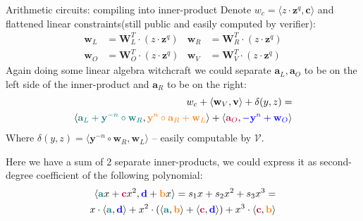 \documentclass{zkdl-presentation-template}
\begin{document}
\begin{frame}{Arithmetic circuits: compiling into inner-product}
    Denote $w_c = \langle z \cdot \mathbf{z}^q, \mathbf{c} \rangle$ and flattened linear constraints(still public and easily computed by verifier):
    \begin{equation*}
        \begin{aligned}
            \mathbf{w}_L &= \mathbf{W}_L^T \cdot (z \cdot \mathbf{z}^q) &
            \mathbf{w}_R &= \mathbf{W}_R^T \cdot (z \cdot \mathbf{z}^q) \\
            \mathbf{w}_O &= \mathbf{W}_O^T \cdot (z \cdot \mathbf{z}^q) &
            \mathbf{w}_V &= \mathbf{W}_V^T \cdot (z \cdot \mathbf{z}^q) 
        \end{aligned}
    \end{equation*}
    Again doing some linear algebra witchcraft we could separate $\mathbf{a}_L, \mathbf{a}_O$ to be on the left side of the inner-product and $\mathbf{a}_R$ to be on the right:
        \begin{equation*}
            \begin{aligned}
                w_c + \langle \mathbf{w}_V, \mathbf{v} \rangle + \delta(y, z) =\\
                \langle \textcolor{teal}{\mathbf{a}_L + \mathbf{y}^{-n} \circ \mathbf{w}_R}, \textcolor{orange}{\mathbf{y}^n \circ \mathbf{a}_R + \mathbf{w}_L} \rangle + \langle \textcolor{purple}{\mathbf{a}_O}, \textcolor{blue}{ -\mathbf{y}^n + \mathbf{w}_O} \rangle
            \end{aligned}
        \end{equation*}
        Where $\delta(y, z) = \langle \mathbf{y}^{-n} \circ \mathbf{w}_R, \mathbf{w}_L \rangle$ -- easily computable by $\mathcal{V}$.

        Here we have a sum of 2 separate inner-products, we could express it as second-degree coefficient of the following polynomial:
        \begin{equation*}
            \begin{aligned}
            \langle \textcolor{teal}{\mathbf{a}}x + \textcolor{purple}{\mathbf{c}}x^2, \textcolor{blue}{\mathbf{d}} + \textcolor{orange}{\mathbf{b}}x \rangle = s_1x + s_2x^2 + s_3x^3 =\\
            x \cdot \langle \textcolor{teal}{\mathbf{a}}, \textcolor{blue}{\mathbf{d}} \rangle + x^2 \cdot (\langle \textcolor{teal}{\mathbf{a}}, \textcolor{orange}{\mathbf{b}} \rangle + \langle \textcolor{purple}{\mathbf{c}}, \textcolor{blue}{\mathbf{d}} \rangle) + x^3 \cdot \langle \textcolor{purple}{\mathbf{c}}, \textcolor{orange}{\mathbf{b}} \rangle
            \end{aligned}
        \end{equation*}
\end{frame}
\end{document}
